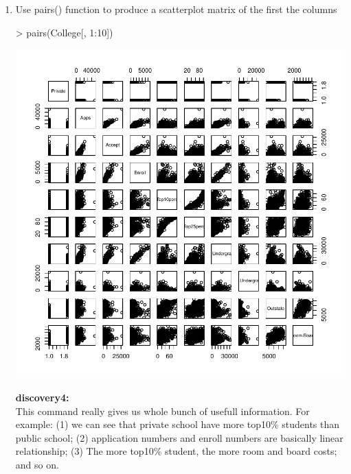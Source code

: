 \documentclass[a4paper]{article}
\begin{document}
\begin{enumerate}
\item Use pairs() function to produce a scatterplot matrix of the first the columns
\begin{Schunk}
\begin{Sinput}
> pairs(College[, 1:10])
\end{Sinput}
\end{Schunk}
\includegraphics{introduction-pairs}

{
\colorbox{BurntOrange}{\textbf{discovery4:}}\color{red}\\
This command really gives us whole bunch of usefull information. For example: (1) we can see that private school have more top10\% students than public school; (2) application numbers and enroll numbers are basically linear relationship; (3) The more top10\% student, the more room and board costs; and so on.
}



\end{enumerate}
\end{document}
